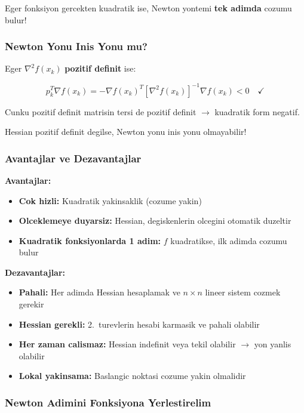 \documentclass[12pt,a4paper]{article}
\theoremstyle{definition}
\theoremstyle{remark}
\begin{document}
Eger fonksiyon gercekten kuadratik ise, Newton yontemi \textbf{tek adimda} cozumu bulur!

\subsubsection{Newton Yonu Inis Yonu mu?}

Eger $\nabla^2 f(x_k)$ \textbf{pozitif definit} ise:

\[
p_k^T \nabla f(x_k) = -\nabla f(x_k)^T [\nabla^2 f(x_k)]^{-1} \nabla f(x_k) < 0 \quad \checkmark
\]

Cunku pozitif definit matrisin tersi de pozitif definit $\rightarrow$ kuadratik form negatif.

\begin{dikkat}
Hessian pozitif definit degilse, Newton yonu inis yonu olmayabilir!
\end{dikkat}

\subsubsection{Avantajlar ve Dezavantajlar}

\textbf{Avantajlar:}
\begin{itemize}[leftmargin=*, itemsep=0.2em]
\item \textbf{Cok hizli:} Kuadratik yakinsaklik (cozume yakin)
\item \textbf{Olceklemeye duyarsiz:} Hessian, degiskenlerin olcegini otomatik duzeltir
\item \textbf{Kuadratik fonksiyonlarda 1 adim:} $f$ kuadratikse, ilk adimda cozumu bulur
\end{itemize}

\textbf{Dezavantajlar:}
\begin{itemize}[leftmargin=*, itemsep=0.2em]
\item \textbf{Pahali:} Her adimda Hessian hesaplamak ve $n \times n$ lineer sistem cozmek gerekir
\item \textbf{Hessian gerekli:} 2.\ turevlerin hesabi karmasik ve pahali olabilir
\item \textbf{Her zaman calismaz:} Hessian indefinit veya tekil olabilir $\rightarrow$ yon yanlis olabilir
\item \textbf{Lokal yakinsama:} Baslangic noktasi cozume yakin olmalidir
\end{itemize}

\subsubsection{Newton Adimini Fonksiyona Yerlestirelim}
\end{document}
